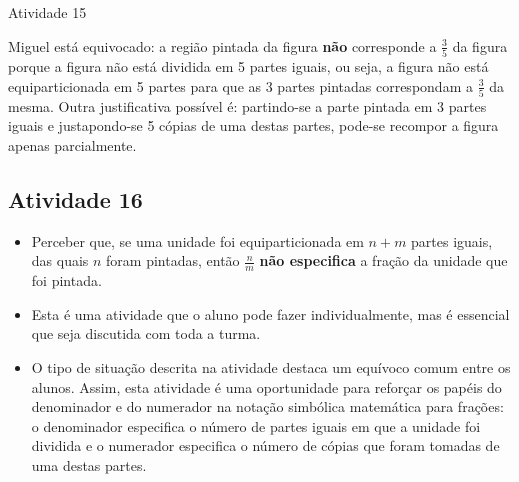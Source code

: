 \begin{multicols}{2}
\begin{resposta*}{Atividade 15}

Miguel está equivocado: a região pintada da figura   {\bf não}   corresponde a   $\frac{3}{5}$ da figura porque a figura não está dividida em 5 partes iguais, ou seja, a figura não está equiparticionada em 5 partes para que as 3 partes pintadas correspondam a   $\frac{3}{5}$ da mesma. Outra justificativa possível é: partindo-se a parte pintada em 3 partes iguais e justapondo-se 5 cópias de uma destas partes, pode-se recompor a figura apenas parcialmente.

\end{resposta*}



\subsection{Atividade 16}

  \vspace{.1cm}

  \begin{itemize} %
    \item       Perceber que, se uma unidade foi equiparticionada em       $n + m$ partes iguais, das quais       $n$ foram pintadas, então       $\frac{n}{m}$     {\bf não especifica}       a fração da unidade que foi pintada.
\end{itemize} %

  \vspace{.1cm}

  \vspace{.1cm}

\begin{itemize} %
    \item       Esta é uma atividade que o aluno pode fazer individualmente, mas é essencial que seja discutida com toda a turma.
    \item       O tipo de situação descrita na atividade destaca um equívoco comum entre os alunos. Assim, esta atividade é uma oportunidade para reforçar os papéis do denominador e do numerador na notação simbólica matemática para frações: o denominador especifica o número de partes iguais em que a unidade foi dividida e o numerador especifica o número de cópias que foram tomadas de uma destas partes.
\end{itemize} %


\end{multicols}

